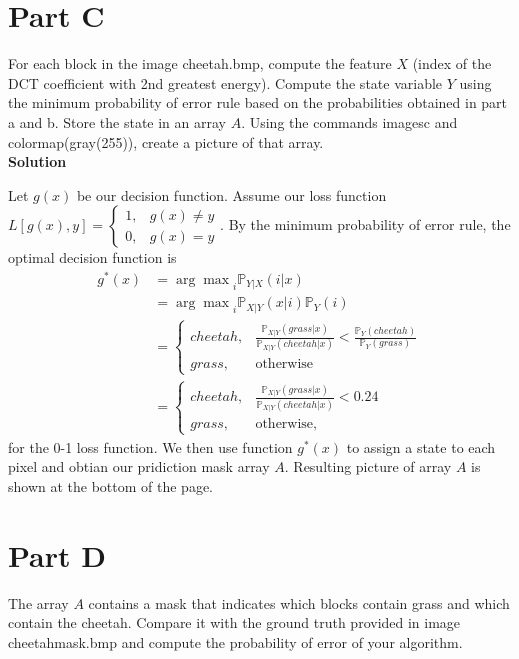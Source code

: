 \documentclass{article}
\newcommand*{\prob}{\mathds{P}}
\begin{document}
\pagebreak

\section*{Part C}

For each block in the image {\selectfont cheetah.bmp}, compute the feature $X$ (index of the DCT coefficient with 2nd greatest energy). Compute the state variable $Y$ using the minimum probability of error rule based on the probabilities obtained in part a and b. Store the state in an array $A$. Using the commands {\selectfont imagesc} and {\selectfont colormap(gray(255))}, create a picture of that array. \\

\textbf{\large Solution}

Let $g(x)$ be our decision function. Assume our loss function $L[g(x), y] = \begin{cases} 1, &g(x) \neq y \\
  0, &g(x) = y \end{cases}$. By the minimum probability of error rule, the optimal decision function is
\begin{align*}
  g^*(x) 
  &= {\arg \max}_{i} \prob_{Y|X}(i | x) \\
  &= {\arg \max}_{i} \prob_{X|Y}(x | i)\prob_Y(i) \\
  &= \begin{cases}
    cheetah, &\frac{\prob_{X|Y}(grass | x)}{\prob_{X|Y}(cheetah | x)} < \frac{\prob_Y(cheetah)}{\prob_Y(grass)} \\
    grass, &\text{otherwise}
  \end{cases} \\
  &= \begin{cases}
    cheetah, &\frac{\prob_{X|Y}(grass | x)}{\prob_{X|Y}(cheetah | x)} < 0.24 \\
    grass, &\text{otherwise},
  \end{cases}
\end{align*}
for the 0-1 loss function. We then use function $g^*(x)$ to assign a state to each pixel and obtian our pridiction mask array $A$. Resulting picture of array $A$ is shown at the bottom of the page.

\section*{Part D}

The array $A$ contains a mask that indicates which blocks contain grass and which contain the cheetah. Compare it with the ground truth provided in image {\selectfont cheetah\textunderscore mask.bmp} and compute the probability of error of your algorithm. \\
\end{document}

